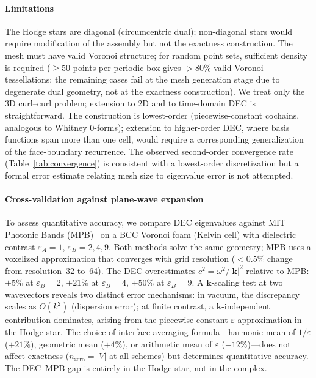 \documentclass[preprint,12pt]{elsarticle}
\begin{document}
\paragraph{Limitations}
The Hodge stars are diagonal (circumcentric dual); non-diagonal stars would require modification of the assembly but not the exactness construction. The mesh must have valid Voronoi structure; for random point sets, sufficient density is required ($\geq 50$ points per periodic box gives $> 80\%$ valid Voronoi tessellations; the remaining cases fail at the mesh generation stage due to degenerate dual geometry, not at the exactness construction). We treat only the 3D curl--curl problem; extension to 2D and to time-domain DEC is straightforward. The construction is lowest-order (piecewise-constant cochains, analogous to Whitney 0-forms); extension to higher-order DEC, where basis functions span more than one cell, would require a corresponding generalization of the face-boundary recurrence. The observed second-order convergence rate (Table~\ref{tab:convergence}) is consistent with a lowest-order discretization but a formal error estimate relating mesh size to eigenvalue error is not attempted.

\paragraph{Cross-validation against plane-wave expansion}
To assess quantitative accuracy, we compare DEC eigenvalues against MIT Photonic Bands (MPB)~\cite{Johnson2001} on a BCC Voronoi foam (Kelvin cell) with dielectric contrast $\varepsilon_A = 1$, $\varepsilon_B = 2, 4, 9$. Both methods solve the same geometry; MPB uses a voxelized approximation that converges with grid resolution ($< 0.5\%$ change from resolution~32 to~64). The DEC overestimates $c^2 = \omega^2/|\mathbf{k}|^2$ relative to MPB: $+5\%$ at $\varepsilon_B = 2$, $+21\%$ at $\varepsilon_B = 4$, $+50\%$ at $\varepsilon_B = 9$. A $\mathbf{k}$-scaling test at two wavevectors reveals two distinct error mechanisms: in vacuum, the discrepancy scales as $O(k^2)$ (dispersion error); at finite contrast, a $\mathbf{k}$-independent contribution dominates, arising from the piecewise-constant $\varepsilon$ approximation in the Hodge star. The choice of interface averaging formula---harmonic mean of $1/\varepsilon$ ($+21\%$), geometric mean ($+4\%$), or arithmetic mean of $\varepsilon$ ($-12\%$)---does not affect exactness ($n_{\mathrm{zero}} = |V|$ at all schemes) but determines quantitative accuracy. The DEC--MPB gap is entirely in the Hodge star, not in the complex.
\end{document}
